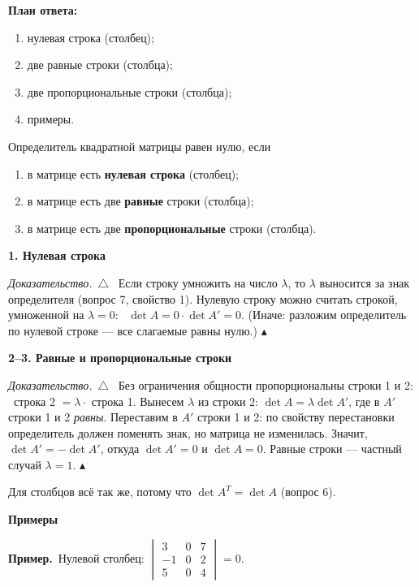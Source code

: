 \documentclass[a4paper,11pt]{article}
\newcommand{\prim}{\par\smallskip\noindent\textbf{\textcolor{teoc!80!black}{Пример.}}\ }
\newenvironment{dok}
  {\par\smallskip\noindent\textit{Доказательство.}\ $\triangle$\ \ignorespaces}
  {\unskip\nobreak\hfill$\blacktriangle$\par\smallskip}
\newcommand{\podr}[1]{\par\needspace{8\baselineskip}\medskip
  {\large\bfseries\textcolor{oprc!80!black}{#1}}\par\nopagebreak\smallskip}
\newcommand{\plan}[1]{\begin{planbox}\textbf{План ответа:}
  \begin{enumerate}[nosep,leftmargin=*,label=\arabic*)]#1\end{enumerate}\end{planbox}}
\begin{document}
\plan{\item нулевая строка (столбец);
\item две равные строки (столбца);
\item две пропорциональные строки (столбца);
\item примеры.}

\begin{teo}
Определитель квадратной матрицы равен нулю, если
\begin{enumerate}[leftmargin=*]
  \item в матрице есть \textbf{нулевая строка} (столбец);
  \item в матрице есть две \textbf{равные} строки (столбца);
  \item в матрице есть две \textbf{пропорциональные} строки (столбца).
\end{enumerate}
\end{teo}

\podr{1. Нулевая строка}

\begin{dok}
Если строку умножить на число $\lambda$, то $\lambda$ выносится за знак определителя (вопрос 7, свойство 1).
Нулевую строку можно считать строкой, умноженной на $\lambda = 0$: \ $\det A = 0 \cdot \det A' = 0$.
(Иначе: разложим определитель по нулевой строке --- все слагаемые равны нулю.)
\end{dok}

\podr{2--3. Равные и пропорциональные строки}

\begin{dok}
Без ограничения общности пропорциональны строки 1 и 2: \ строка 2 $= \lambda \cdot$ строка 1. Вынесем $\lambda$ из строки 2:
$\det A = \lambda \det A'$, где в $A'$ строки 1 и 2 \emph{равны}. Переставим в $A'$ строки 1 и 2: по свойству перестановки
определитель должен поменять знак, но матрица не изменилась. Значит, $\det A' = -\det A'$, откуда $\det A' = 0$
и $\det A = 0$. Равные строки --- частный случай $\lambda = 1$.
\end{dok}

Для столбцов всё так же, потому что $\det A^T = \det A$ (вопрос 6).

\podr{Примеры}

\prim Нулевой столбец: $\begin{vmatrix} 3 & 0 & 7 \\ -1 & 0 & 2 \\ 5 & 0 & 4 \end{vmatrix} = 0$.
\end{document}
